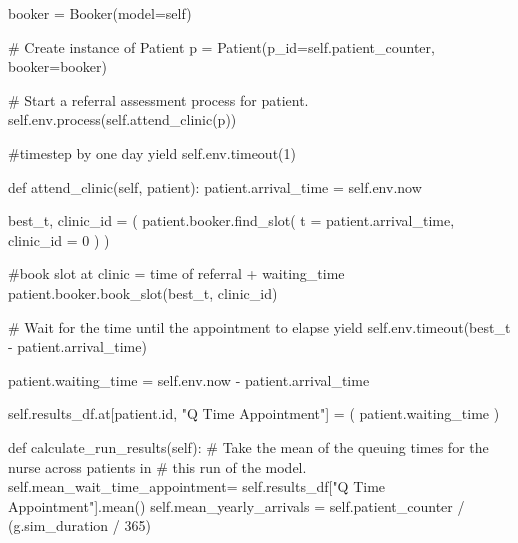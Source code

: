 \documentclass[
  letterpaper,
  DIV=11,
  numbers=noendperiod]{scrreprt}
\newenvironment{Shaded}{}{}
\newcommand{\BuiltInTok}[1]{\textcolor[rgb]{0.84,0.23,0.29}{#1}}
\newcommand{\CommentTok}[1]{\textcolor[rgb]{0.42,0.45,0.49}{#1}}
\newcommand{\ControlFlowTok}[1]{\textcolor[rgb]{0.84,0.23,0.29}{#1}}
\newcommand{\DecValTok}[1]{\textcolor[rgb]{0.00,0.36,0.77}{#1}}
\newcommand{\KeywordTok}[1]{\textcolor[rgb]{0.84,0.23,0.29}{#1}}
\newcommand{\NormalTok}[1]{\textcolor[rgb]{0.14,0.16,0.18}{#1}}
\newcommand{\OperatorTok}[1]{\textcolor[rgb]{0.14,0.16,0.18}{#1}}
\newcommand{\StringTok}[1]{\textcolor[rgb]{0.01,0.18,0.38}{#1}}
\newcommand{\VariableTok}[1]{\textcolor[rgb]{0.89,0.38,0.04}{#1}}
\newcommand*\circled[1]{\tikz[baseline=(char.base)]{
          \node[shape=circle,draw,inner sep=1pt] (char) {{\scriptsize#1}};}}
\begin{document}
\begin{tcolorbox}
\begin{Shaded}
\begin{Highlighting}[]
\NormalTok{                booker }\OperatorTok{=}\NormalTok{ Booker(model}\OperatorTok{=}\VariableTok{self}\NormalTok{)}

                \CommentTok{\# Create instance of Patient}
\NormalTok{                p }\OperatorTok{=}\NormalTok{ Patient(p\_id}\OperatorTok{=}\VariableTok{self}\NormalTok{.patient\_counter, booker}\OperatorTok{=}\NormalTok{booker)}

                \CommentTok{\# Start a referral assessment process for patient.}
                \VariableTok{self}\NormalTok{.env.process(}\VariableTok{self}\NormalTok{.attend\_clinic(p))}

            \CommentTok{\#timestep by one day}
            \ControlFlowTok{yield} \VariableTok{self}\NormalTok{.env.timeout(}\DecValTok{1}\NormalTok{)}

    \KeywordTok{def}\NormalTok{ attend\_clinic(}\VariableTok{self}\NormalTok{, patient):}
\NormalTok{        patient.arrival\_time }\OperatorTok{=} \VariableTok{self}\NormalTok{.env.now}

\NormalTok{        best\_t, clinic\_id }\OperatorTok{=}\NormalTok{ (}
\NormalTok{                patient.booker.find\_slot(}
\NormalTok{                  t }\OperatorTok{=}\NormalTok{ patient.arrival\_time, }\hspace*{\fill}\NormalTok{\circled{1}}
\NormalTok{                  clinic\_id }\OperatorTok{=} \DecValTok{0} \hspace*{\fill}\NormalTok{\circled{2}}
\NormalTok{                  )}
\NormalTok{        )}

        \CommentTok{\#book slot at clinic = time of referral + waiting\_time}
\NormalTok{        patient.booker.book\_slot(best\_t, clinic\_id)}

        \CommentTok{\# Wait for the time until the appointment to elapse}
        \ControlFlowTok{yield} \VariableTok{self}\NormalTok{.env.timeout(best\_t }\OperatorTok{{-}}\NormalTok{ patient.arrival\_time)}

\NormalTok{        patient.waiting\_time }\OperatorTok{=} \VariableTok{self}\NormalTok{.env.now }\OperatorTok{{-}}\NormalTok{ patient.arrival\_time}

        \VariableTok{self}\NormalTok{.results\_df.at[patient.}\BuiltInTok{id}\NormalTok{, }\StringTok{"Q Time Appointment"}\NormalTok{] }\OperatorTok{=}\NormalTok{ (}
\NormalTok{                  patient.waiting\_time}
\NormalTok{                  )}

    \KeywordTok{def}\NormalTok{ calculate\_run\_results(}\VariableTok{self}\NormalTok{):}
        \CommentTok{\# Take the mean of the queuing times for the nurse across patients in}
        \CommentTok{\# this run of the model.}
        \VariableTok{self}\NormalTok{.mean\_wait\_time\_appointment}\OperatorTok{=} \VariableTok{self}\NormalTok{.results\_df[}\StringTok{"Q Time Appointment"}\NormalTok{].mean()}
        \VariableTok{self}\NormalTok{.mean\_yearly\_arrivals }\OperatorTok{=} \VariableTok{self}\NormalTok{.patient\_counter }\OperatorTok{/}\NormalTok{ (g.sim\_duration }\OperatorTok{/} \DecValTok{365}\NormalTok{)}


\end{Highlighting}
\end{Shaded}
\end{tcolorbox}
\end{document}
